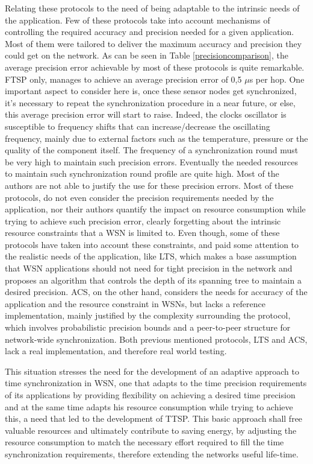 Relating these protocols to the need of being adaptable to the intrinsic needs of the application. Few of these protocols take into account mechanisms of controlling the required accuracy and precision needed for a given application. Most of 
them were tailored to deliver the maximum accuracy and precision they could get on the network. As can be seen in Table \ref{precisioncomparison}, the average precision error achievable by most of these protocols is quite remarkable. FTSP only, manages to achieve an average precision error of 0,5 $\mu$s per hop. One important aspect to consider here is, once these sensor nodes get synchronized, it's necessary to repeat the synchronization procedure in a near future, or else, this average precision error will start to raise. Indeed, the clocks oscillator is susceptible to frequency shifts that can increase/decrease the oscillating frequency, mainly due to external factors such as the temperature, pressure or the quality of the component itself. The frequency of a synchronization round must be very high to maintain such precision errors. Eventually the needed resources to maintain such synchronization round profile are quite high. Most of the authors are not able to justify the use for these precision errors. Most of these protocols, do not even consider the precision requirements needed by the application, nor their authors quantify the impact on resource consumption while trying to achieve such precision error, clearly forgetting about the intrinsic resource constraints that a WSN is limited to. Even though, some of these protocols have taken into account these constraints, and paid some attention to the realistic needs of the application, like LTS, which makes a base assumption that WSN applications should not need for tight precision in the network and proposes an algorithm that controls the depth of its spanning tree to maintain a desired precision. ACS, on the other hand, considers the needs for accuracy of the application and the resource constraint in WSNs, but lacks a reference implementation, mainly justified by the complexity surrounding the protocol, which involves probabilistic precision bounds and a peer-to-peer structure for network-wide synchronization. Both previous mentioned protocols, LTS and ACS, lack a real implementation, and therefore real world testing.

This situation stresses the need for the development of an adaptive approach to time synchronization in WSN, one that adapts to the time precision requirements of its applications by providing flexibility on achieving a desired time precision and at the same time adapts his resource consumption while trying to achieve this, a need that led to the development of TTSP. This basic approach shall free valuable resources and ultimately contribute to saving energy, by adjusting the resource consumption to match the necessary effort required to fill the time synchronization requirements, therefore extending the networks useful life-time.

